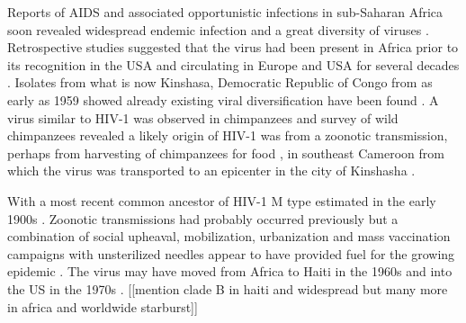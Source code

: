 \documentclass[../sherrill-Mix_thesis.tex]{subfiles}
\begin{document}
	Reports of AIDS and associated opportunistic infections in sub-Saharan Africa soon revealed widespread endemic infection \citep{Clumeck1983,Clumeck1984,VandePerre1984,Piot1984} and a great diversity of viruses \citep{Nkengasong1994,Louwagie1995,Vidal2000,Rambaut2001,Yang2001,Kalish2004}. Retrospective studies suggested that the virus had been present in Africa prior to its recognition in the USA \citep{Bygbjerg1983,Vandepitte1983,Clumeck1984} and circulating in Europe and USA for several decades \citep{Froland1988,Garry1988}. Isolates from what is now Kinshasa, Democratic Republic of Congo from as early as 1959 showed already existing viral diversification have been found \citep{Nahmias1986,Zhu1998,Worobey2008}. A virus similar to HIV-1 was observed in chimpanzees \citep{Peeters1989,Huet1990} and survey of wild chimpanzees revealed a likely origin of HIV-1 was from a zoonotic transmission, perhaps from harvesting of chimpanzees for food \citep{Bowen-Jones1999,Hahn2000,Peeters2002,Wolfe2004,Wolfe2005,Kalish2005}, in southeast Cameroon \citep{Gao1999,Keele2006,VanHeuverswyn2007} from which the virus was transported to an epicenter in the city of Kinshasha \citep{Vidal2000,Vangroenweghe2001,Worobey2008,Sharp2008,Faria2014}.
	
	With a most recent common ancestor of HIV-1 M type estimated in the early 1900s \citep{Korber2000,Salemi2001,Sharp2001,Yusim2001,Worobey2008,Faria2014}. Zoonotic transmissions had probably occurred previously but a combination of social upheaval, mobilization, urbanization and mass vaccination campaigns with unsterilized needles appear to have provided fuel for the growing epidemic \citep{Chitnis2000,deSousa2010,deSousa2012,Faria2014}. The virus may have moved from Africa to Haiti in the 1960s and into the US in the 1970s \citep{Gilbert2007}. [[mention clade B in haiti and widespread but many more in africa and worldwide starburst]]

\end{document}
